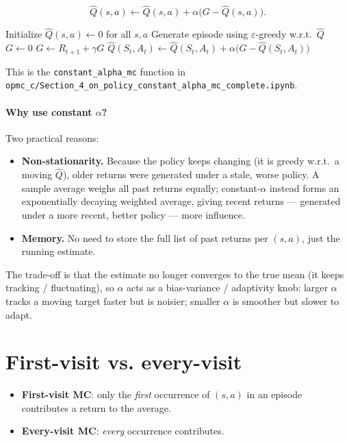 \documentclass[11pt]{article}
\begin{document}
\[
    \hat{Q}(s,a) \leftarrow \hat{Q}(s,a) + \alpha \Big( G - \hat{Q}(s,a) \Big).
\]

\begin{algorithm}[h]
\caption{On-policy MC control, constant step size $\alpha$}
\begin{algorithmic}[1]
\State Initialize $\hat{Q}(s,a) \leftarrow 0$ for all $s,a$
    \State Generate episode using $\varepsilon$-greedy w.r.t.\ $\hat{Q}$
    \State $G \leftarrow 0$
        \State $G \leftarrow R_{t+1} + \gamma G$
        \State $\hat{Q}(S_t, A_t) \leftarrow \hat{Q}(S_t, A_t) + \alpha \big( G - \hat{Q}(S_t, A_t) \big)$
    \EndFor
\EndFor
\end{algorithmic}
\end{algorithm}

This is the \texttt{constant\_alpha\_mc} function in
\texttt{opmc\_c/Section\_4\_on\_policy\_constant\_alpha\_mc\_complete.ipynb}.

\paragraph{Why use constant $\alpha$?} Two practical reasons:
\begin{itemize}
    \item \textbf{Non-stationarity.} Because the policy keeps changing
        (it is greedy w.r.t.\ a moving $\hat{Q}$), older returns were
        generated under a stale, worse policy. A sample average weighs all
        past returns equally; constant-$\alpha$ instead forms an
        exponentially decaying weighted average, giving recent returns —
        generated under a more recent, better policy — more influence.
    \item \textbf{Memory.} No need to store the full list of past returns
        per $(s,a)$, just the running estimate.
\end{itemize}

The trade-off is that the estimate no longer converges to the true mean
(it keeps tracking / fluctuating), so $\alpha$ acts as a bias-variance /
adaptivity knob: larger $\alpha$ tracks a moving target faster but is
noisier; smaller $\alpha$ is smoother but slower to adapt.

\section{First-visit vs. every-visit}

\begin{itemize}
    \item \textbf{First-visit MC}: only the \emph{first} occurrence of
        $(s,a)$ in an episode contributes a return to the average.
    \item \textbf{Every-visit MC}: \emph{every} occurrence contributes.
\end{itemize}
\end{document}
